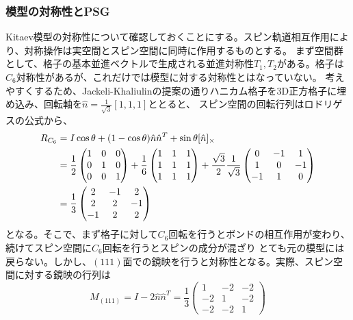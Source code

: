 \documentclass[11pt, aps, longbibliography]{article}
\begin{document}
        \subsubsection{模型の対称性とPSG\cite{PhysRevB.86.085145}}
        Kitaev模型の対称性について確認しておくことにする。スピン軌道相互作用により、対称操作は実空間とスピン空間に同時に作用するものとする。
        まず空間群として、格子の基本並進ベクトルで生成される並進対称性$T_1,T_2$がある。格子は$C_6$対称性があるが、これだけでは模型に対する対称性とはなっていない。
        考えやすくするため、Jackeli-Khaliulinの提案の通りハニカム格子を3D正方格子に埋め込み、回転軸を$\hat{n} = \frac{1}{\sqrt{3}} \left[1,1,1\right]$ととると、
        スピン空間の回転行列はロドリゲスの公式から、
        \begin{align}\label{eq:Kit-Sym-1}
            R_{C_6} &= I\cos \theta +(1-\cos \theta) \hat{n}\hat{n}^T + \sin \theta [\hat{n}]_{\times} \notag \\
            &= \frac{1}{2}\begin{pmatrix}
                1 & 0 & 0 \\ 0 & 1 & 0 \\0 & 0 & 1
            \end{pmatrix} + \frac{1}{6}\begin{pmatrix}
                1 & 1 & 1 \\ 1 & 1 & 1 \\ 1 & 1 & 1
            \end{pmatrix} + \frac{\sqrt{3}}{2}\frac{1}{\sqrt{3}} \begin{pmatrix}
                0 & -1 & 1 \\ 1 & 0 & -1 \\ -1 & 1 & 0
            \end{pmatrix} \notag \\
            &= \frac{1}{3}\begin{pmatrix}
                2 & -1 & 2 \\ 2 & 2 & -1 \\ -1 & 2 & 2
            \end{pmatrix}
        \end{align}
        となる。そこで、まず格子に対して$C_6$回転を行うとボンドの相互作用が変わり、続けてスピン空間に$C_6$回転を行うとスピンの成分が混ざり
        とても元の模型には戻らない。しかし、$(111)$面での鏡映を行うと対称性となる。実際、スピン空間に対する鏡映の行列は
        \begin{equation}\label{eq:Kit-Sym-2}
            M_{(111)} = I - 2\hat{n}\hat{n}^T = \frac{1}{3}\begin{pmatrix}
                1 & -2 & -2 \\ -2 & 1 & -2 \\ -2 & -2 & 1
            \end{pmatrix}
        \end{equation}
\end{document}
